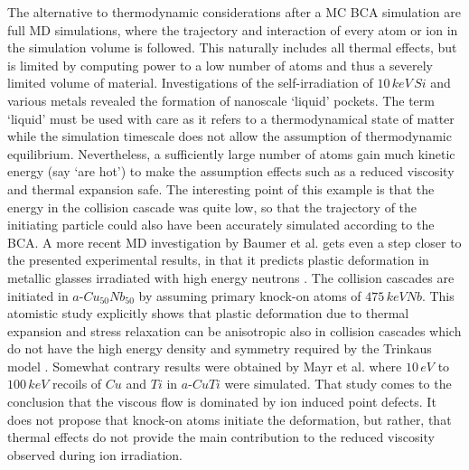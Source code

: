 The alternative to thermodynamic considerations after a MC BCA simulation are full MD simulations, where the trajectory and interaction of every atom or ion in the simulation volume is followed. This naturally includes all thermal effects, but is limited by computing power to a low number of atoms and thus a severely limited volume of material. Investigations of the self-irradiation of $10\,keV\,Si$ and various metals \cite{nordlund_defect_1998} revealed the formation of nanoscale `liquid' pockets. The term `liquid' must be used with care as it refers to a thermodynamical state of matter while the simulation timescale does not allow the assumption of thermodynamic equilibrium. Nevertheless, a sufficiently large number of atoms gain much kinetic energy (say `are hot') to make the assumption effects such as a reduced viscosity and thermal expansion safe. The interesting point of this example is that the energy in the collision cascade was quite low, so that the trajectory of the initiating particle could also have been accurately simulated according to the BCA. A more recent MD investigation by Baumer et al. gets even a step closer to the presented experimental results, in that it predicts plastic deformation in metallic glasses irradiated with high energy neutrons \cite{baumer_prediction_2014}. The collision cascades are initiated in $a$-$Cu_{50}Nb_{50}$ by assuming primary knock-on atoms of $475\,keV Nb$. This atomistic study explicitly shows that plastic deformation due to thermal expansion and stress relaxation can be anisotropic also in collision cascades which do not have the high energy density and symmetry required by the Trinkaus model \cite{trinkaus_viscoelastic_1995}. Somewhat contrary results were obtained by Mayr et al. \cite{mayr_mechanisms_2003} where $10\,eV$ to $100\,keV$ recoils of $Cu$ and $Ti$ in $a$-$CuTi$ were simulated. That study comes to the conclusion that the viscous flow is dominated by ion induced point defects. It does not propose that knock-on atoms initiate the deformation, but rather, that thermal effects do not provide the main contribution to the reduced viscosity observed during ion irradiation.


